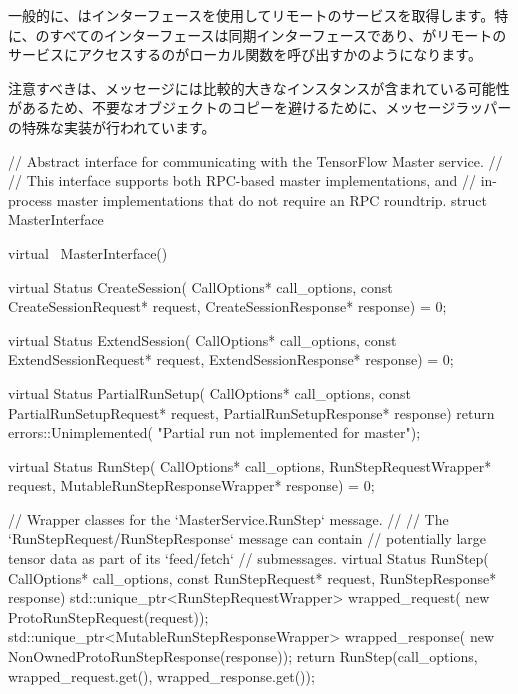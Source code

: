 \begin{content}
一般的に、はインターフェースを使用してリモートのサービスを取得します。特に、のすべてのインターフェースは同期インターフェースであり、がリモートのサービスにアクセスするのがローカル関数を呼び出すかのようになります。

注意すべきは、メッセージには比較的大きなインスタンスが含まれている可能性があるため、不要なオブジェクトのコピーを避けるために、メッセージラッパーの特殊な実装が行われています。

\begin{leftbar}
\begin{c++}
// Abstract interface for communicating with the TensorFlow Master service.
//
// This interface supports both RPC-based master implementations, and
// in-process master implementations that do not require an RPC roundtrip.
struct MasterInterface {
  virtual ~MasterInterface() {}
  
  virtual Status CreateSession(
      CallOptions* call_options,
      const CreateSessionRequest* request,
      CreateSessionResponse* response) = 0;

  virtual Status ExtendSession(
      CallOptions* call_options,
      const ExtendSessionRequest* request,
      ExtendSessionResponse* response) = 0;

  virtual Status PartialRunSetup(
      CallOptions* call_options,
      const PartialRunSetupRequest* request,
      PartialRunSetupResponse* response) {
    return errors::Unimplemented(
      "Partial run not implemented for master");
  }

  virtual Status RunStep(
      CallOptions* call_options,
      RunStepRequestWrapper* request,
      MutableRunStepResponseWrapper* response) = 0;

  // Wrapper classes for the `MasterService.RunStep` message.
  //
  // The `RunStepRequest/RunStepResponse` message can contain 
  // potentially large tensor data as part of its `feed/fetch` 
  // submessages.
  virtual Status RunStep(
    CallOptions* call_options,
    const RunStepRequest* request,
    RunStepResponse* response) {
    std::unique_ptr<RunStepRequestWrapper> wrapped_request(
        new ProtoRunStepRequest(request));
    std::unique_ptr<MutableRunStepResponseWrapper> wrapped_response(
        new NonOwnedProtoRunStepResponse(response));
    return RunStep(call_options, 
        wrapped_request.get(), 
        wrapped_response.get());
  }

}
\end{c++}
\end{leftbar}
\end{content}
